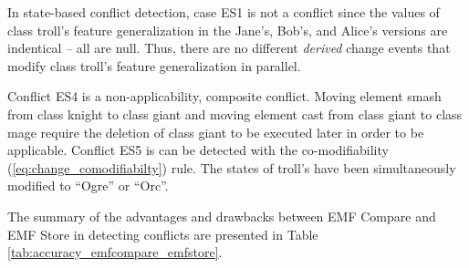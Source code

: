 In state-based conflict detection, case ES1 is not a conflict since the values of class \textsf{troll}'s feature \textsf{generalization} in the Jane's, Bob's, and Alice's versions are indentical -- all are null. Thus, there are no different \textit{derived} change events that modify class \textsf{troll}'s feature \textsf{generalization} in parallel. 

Conflict ES4 is a non-applicability, composite conflict. Moving element \textsf{smash} from class \textsf{knight} to class \textsf{giant} and moving element \textsf{cast} from class \textsf{giant} to class \textsf{mage} require the deletion of class \textsf{giant} to be executed later in order to be applicable. Conflict ES5 is can be detected with the co-modifiability  (\ref{eq:change_comodifiabilty}) rule. The states of \textsf{troll}'s  have been simultaneously modified to ``Ogre'' or ``Orc''.

The summary of the advantages and drawbacks between EMF Compare and EMF Store in detecting conflicts are presented in Table \ref{tab:accuracy_emfcompare_emfstore}.

